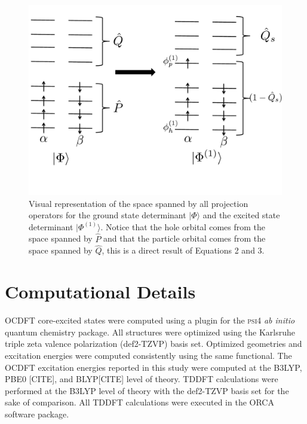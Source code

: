 \documentclass[12pt]{article}
\begin{document}
\begin{figure}
\includegraphics[scale=0.35]{Figure1.pdf}
\caption{Visual representation of the space spanned by all projection operators for the ground state determinant $|\Phi\rangle$ and the excited state determinant $|\Phi^{(1)}\rangle$. Notice that the hole orbital comes from the space spanned by $\hat{P}$ and that the particle orbital comes from the space spanned by  $\hat{Q}$, this is a direct result of Equations 2 and 3.}
\label{fig:projection}
\end{figure}


\section{Computational Details}
OCDFT core-excited states were computed using a plugin for the \textsc{psi4} \textit{ab initio} quantum chemistry package.\cite{turney_psi4:_2012}
All structures were optimized using the Karlsruhe triple zeta valence polarization (def2-TZVP) basis set.\cite{weigend_balanced_2005,weigend_accurate_2006}  Optimized geometries and excitation energies were computed consistently using the same functional. The OCDFT excitation energies reported in this study were computed at the B3LYP, \cite{becke_new_1993,lee_development_1988,vosko_accurate_1980,stephens_ab_1994} PBE0 [CITE], and BLYP[CITE] level of theory. TDDFT calculations were performed at the B3LYP level of theory with the def2-TZVP basis set for the sake of comparison. All TDDFT calculations were executed in the ORCA software package\cite{neese_orca_2012}.
\end{document}
